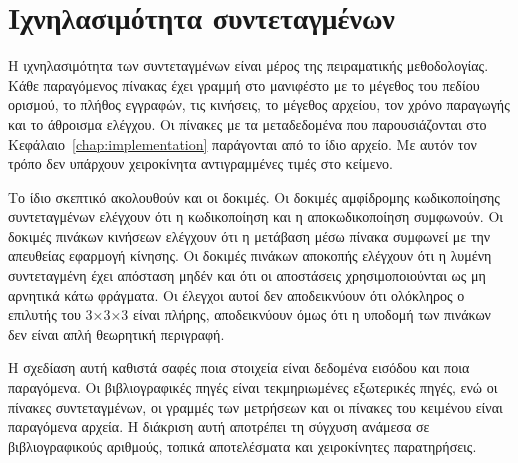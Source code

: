 \section{Ιχνηλασιμότητα συντεταγμένων}
\label{sec:model-traceability}
Η ιχνηλασιμότητα των συντεταγμένων είναι μέρος της πειραματικής μεθοδολογίας. Κάθε παραγόμενος πίνακας έχει γραμμή στο μανιφέστο με το μέγεθος του πεδίου ορισμού, το πλήθος εγγραφών, τις κινήσεις, το μέγεθος αρχείου, τον χρόνο παραγωγής και το άθροισμα ελέγχου. Οι πίνακες με τα μεταδεδομένα που παρουσιάζονται στο Κεφάλαιο~\ref{chap:implementation} παράγονται από το ίδιο αρχείο. Με αυτόν τον τρόπο δεν υπάρχουν χειροκίνητα αντιγραμμένες τιμές στο κείμενο.

Το ίδιο σκεπτικό ακολουθούν και οι δοκιμές. Οι δοκιμές αμφίδρομης κωδικοποίησης συντεταγμένων ελέγχουν ότι η κωδικοποίηση και η αποκωδικοποίηση συμφωνούν. Οι δοκιμές πινάκων κινήσεων ελέγχουν ότι η μετάβαση μέσω πίνακα συμφωνεί με την απευθείας εφαρμογή κίνησης. Οι δοκιμές πινάκων αποκοπής ελέγχουν ότι η λυμένη συντεταγμένη έχει απόσταση μηδέν και ότι οι αποστάσεις χρησιμοποιούνται ως μη αρνητικά κάτω φράγματα. Οι έλεγχοι αυτοί δεν αποδεικνύουν ότι ολόκληρος ο επιλυτής του 3×3×3 είναι πλήρης, αποδεικνύουν όμως ότι η υποδομή των πινάκων δεν είναι απλή θεωρητική περιγραφή.

Η σχεδίαση αυτή καθιστά σαφές ποια στοιχεία είναι δεδομένα εισόδου και ποια παραγόμενα. Οι βιβλιογραφικές πηγές είναι τεκμηριωμένες εξωτερικές πηγές, ενώ οι πίνακες συντεταγμένων, οι γραμμές των μετρήσεων και οι πίνακες του κειμένου είναι παραγόμενα αρχεία. Η διάκριση αυτή αποτρέπει τη σύγχυση ανάμεσα σε βιβλιογραφικούς αριθμούς, τοπικά αποτελέσματα και χειροκίνητες παρατηρήσεις.
